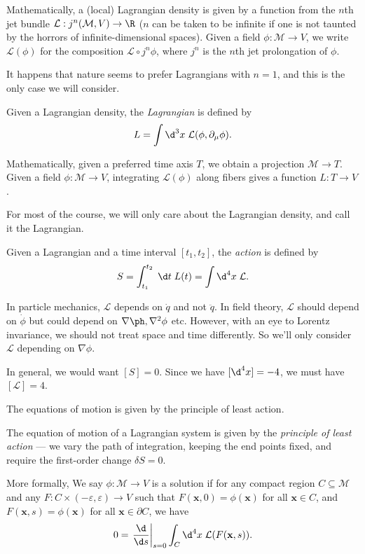 \documentclass[a4paper]{article}
\begin{document}
\begin{own}
  Mathematically, a (local) Lagrangian density is given by a function from the $n$th jet bundle $\mathcal{L}: j^n(\mathcal{M}, V) \to \R$ ($n$ can be taken to be infinite if one is not taunted by the horrors of infinite-dimensional spaces). Given a field $\phi: \mathcal{M} \to V$, we write $\mathcal{L}(\phi)$ for the composition $\mathcal{L} \circ j^n \phi$, where $j^n$ is the $n$th jet prolongation of $\phi$.

  It happens that nature seems to prefer Lagrangians with $n = 1$, and this is the only case we will consider.
\end{own}

\begin{defi}[Lagrangian]
  Given a Lagrangian density, the \emph{Lagrangian} is defined by
  \[
    L = \int \d^3 x\; \mathcal{L}(\phi, \partial_\mu \phi).
  \]
  \begin{own}
    Mathematically, given a preferred time axis $T$, we obtain a projection $\mathcal{M} \to T$. Given a field $\phi: \mathcal{M} \to V$, integrating $\mathcal{L}(\phi)$ along fibers gives a function $L: T \to V$.
  \end{own}
\end{defi}
For most of the course, we will only care about the Lagrangian density, and call it the Lagrangian.

\begin{defi}[Action]
  Given a Lagrangian and a time interval $[t_1, t_2]$, the \emph{action} is defined by
  \[
    S = \int_{t_1}^{t_2} \;\d t\; L(t) = \int \d^4 x\; \mathcal{L}.
  \]
\end{defi}
In particle mechanics, $\mathcal{L}$ depends on $\dot{q}$ and not $\ddot{q}$. In field theory, $\mathcal{L}$ should depend on $\dot{\phi}$ but could depend on $\nabla \ph, \nabla^2\phi$ etc. However, with an eye to Lorentz invariance, we should not treat space and time differently. So we'll only consider $\mathcal{L}$ depending on $\nabla \phi$.

In general, we would want $[S] = 0$. Since we have $[\d^4 x] = -4$, we must have $[\mathcal{L}] = 4$.

The equations of motion is given by the principle of least action.
\begin{defi}
  The equation of motion of a Lagrangian system is given by the \emph{principle of least action} --- we vary the path of integration, keeping the end points fixed, and require the first-order change $\delta S = 0$.

  \begin{own}
    More formally, We say $\phi:\mathcal{M} \to V$ is a solution if for any compact region $C \subseteq \mathcal{M}$ and any $F: C \times (-\varepsilon, \varepsilon) \to V$ such that $F(\mathbf{x}, 0) = \phi(\mathbf{x})$ for all $\mathbf{x} \in C$, and $F(\mathbf{x}, s) = \phi(\mathbf{x})$ for all $\mathbf{x} \in \partial C$, we have
    \[
      0 = \left.\frac{\d}{\d s}\right|_{s = 0} \int_C \d^4 x\; \mathcal{L}(F(\mathbf{x}, s)).
    \]
  \end{own}
\end{defi}
\end{document}
